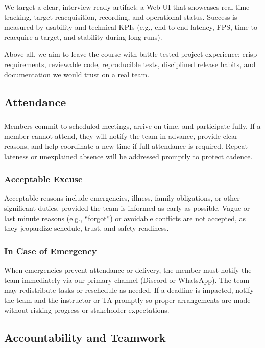 \documentclass{article}
\begin{document}
We target a clear, interview ready artifact: a Web UI that showcases real time
tracking, target reacquisition, recording, and operational status. Success is
measured by usability and technical KPIs (e.g., end to end latency, FPS, time
to reacquire a target, and stability during long runs).

Above all, we aim to leave the course with battle tested project experience:
crisp requirements, reviewable code, reproducible tests, disciplined release
habits, and documentation we would trust on a real team.
\subsection*{Attendance}

\subsubsection*{\color{blue}{Expectations}}

Members commit to scheduled meetings, arrive on time, and participate fully.
If a member cannot attend, they will notify the team in advance, provide clear
reasons, and help coordinate a new time if full attendance is required. Repeat
lateness or unexplained absence will be addressed promptly to protect cadence.

\subsubsection*{\color{blue}Acceptable Excuse}

Acceptable reasons include emergencies, illness, family obligations, or other
significant duties, provided the team is informed as early as possible. Vague
or last minute reasons (e.g., ``forgot'') or avoidable conflicts are not
accepted, as they jeopardize schedule, trust, and safety readiness.

\subsubsection*{\color{blue}In Case of Emergency}

When emergencies prevent attendance or delivery, the member must notify the
team immediately via our primary channel (Discord or WhatsApp). The team may
redistribute tasks or reschedule as needed. If a deadline is impacted, notify
the team and the instructor or TA promptly so proper arrangements are made
without risking progress or stakeholder expectations.
    \subsection*{Accountability and Teamwork}
\end{document}
